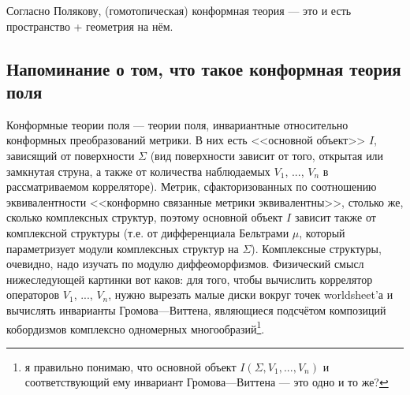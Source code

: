 \documentclass[11pt]{article}
\theoremstyle{remark}
\theoremstyle{definition}
\newcommand{\que}[1]{\footnote{\textcolor[rgb]{0.38,0.69,0.82}{#1}}}
\begin{document}
Согласно Полякову, (гомотопическая) конформная теория --- это и есть пространство + геометрия на нём.

\subsection{Напоминание о том, что такое конформная теория поля}

Конформные теории поля --- теории поля, инвариантные относительно конформных преобразований метрики. В них есть <<основной объект>> $I$, зависящий от поверхности $\Sigma$ (вид поверхности зависит от того, открытая или замкнутая струна, а также от количества наблюдаемых $V_1$, ..., $V_n$ в рассматриваемом корреляторе). Метрик, сфакторизованных по соотношению эквивалентности <<конформно связанные метрики эквивалентны>>, столько же, сколько комплексных структур, поэтому основной объект $I$ зависит также от комплексной структуры (т.е. от дифференциала Бельтрами $\mu$, который параметризует модули комплексных структур на $\Sigma$). Комплексные структуры, очевидно, надо изучать по модулю диффеоморфизмов. Физический смысл нижеследующей картинки вот каков: для того, чтобы вычислить коррелятор операторов $V_1$, ..., $V_n$, нужно вырезать малые диски вокруг точек worldsheet'а и вычислять инварианты Громова---Виттена, являющиеся подсчётом композиций кобордизмов комплексно одномерных многообразий\que{я правильно понимаю, что основной объект $I(\Sigma, V_1, ..., V_n)$ и соответствующий ему инвариант Громова---Виттена --- это одно и то же?}.
\end{document}
